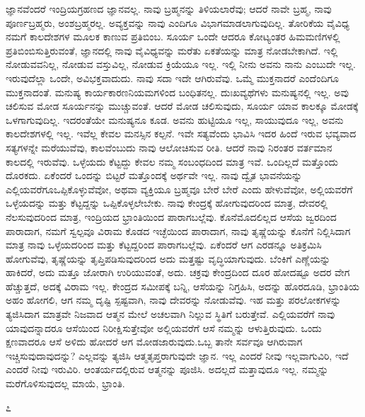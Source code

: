 ಜ್ಞಾನವೆಂದರೆ ಇಂದ್ರಿಯಗ್ರಹಣದ ಜ್ಞಾನವಲ್ಲ. ನಾವು ಬ್ರಹ್ಮನನ್ನು ತಿಳಿಯಲಾರೆವು; ಆದರೆ ನಾವೇ ಬ್ರಹ್ಮ, ನಾವು ಪೂರ್ಣಬ್ರಹ್ಮರು, ಅಂಶಬ್ರಹ್ಮರಲ್ಲ. ಅವ್ಯಕ್ತವನ್ನು ನಾವು ಎಂದಿಗೂ ವಿಭಾಗಮಾಡಲಾಗುವುದಿಲ್ಲ. ತೋರಿಕೆಯ ವೈವಿಧ್ಯ ನಮಗೆ ಕಾಲದೇಶಗಳ ಮೂಲಕ ಕಾಣುವ ಪ್ರತಿಬಿಂಬ. ಸೂರ್ಯ ಒಂದೇ ಆದರೂ ಕೋಟ್ಯಂತರ ಹಿಮಮಣಿಗಳಲ್ಲಿ ಪ್ರತಿಬಿಂಬಿಸುತ್ತಿರುವಂತೆ, ಜ್ಞಾನದಲ್ಲಿ ನಾವು ವೈವಿಧ್ಯವನ್ನು ಮರೆತು ಏಕತೆಯನ್ನು ಮಾತ್ರ ನೋಡಬೇಕಾಗಿದೆ. ಇಲ್ಲಿ ನೋಡುವವನಿಲ್ಲ, ನೋಡುವ ವಸ್ತುವಿಲ್ಲ, ನೋಡುವ ಕ್ರಿಯೆಯೂ ಇಲ್ಲ. ಇಲ್ಲಿ ನೀನು ಅವನು ನಾನು ಎಂಬುದೇ ಇಲ್ಲ. ಇರುವುದೆಲ್ಲಾ ಒಂದೇ, ಅವಿಭಕ್ತವಾದುದು. ನಾವು ಸದಾ ಇದೇ ಆಗಿರುವೆವು. ಒಮ್ಮೆ ಮುಕ್ತನಾದರೆ ಎಂದೆಂದಿಗೂ ಮುಕ್ತನಾದಂತೆ. ಮನುಷ್ಯ ಕಾರ್ಯಕಾರಣನಿಯಮಗಳಿಂದ ಬಂಧಿತನಲ್ಲ. ದುಃಖವ್ಯಥೆಗಳು ಮನುಷ್ಯನಲ್ಲಿ ಇಲ್ಲ. ಅವು ಚಲಿಸುವ ಮೋಡ ಸೂರ್ಯನನ್ನು ಮುಚ್ಚುವಂತೆ. ಆದರೆ ಮೋಡ ಚಲಿಸುವುದು, ಸೂರ್ಯ ಯಾವ ಕಾಲಕ್ಕೂ ಮೋಡಕ್ಕೆ ಒಳಗಾಗುವುದಿಲ್ಲ. ಇದರಂತೆಯೇ ಮನುಷ್ಯನೂ ಕೂಡ. ಅವನು ಹುಟ್ಟಿಯೂ ಇಲ್ಲ, ಸಾಯುವುದೂ ಇಲ್ಲ, ಅವನು ಕಾಲದೇಶಗಳಲ್ಲಿ ಇಲ್ಲ. ಇವೆಲ್ಲ ಕೇವಲ ಮನಸ್ಸಿನ ಕಲ್ಪನೆ. ಇವೇ ಸತ್ಯವೆಂದು ಭಾವಿಸಿ ಇದರ ಹಿಂದೆ ಇರುವ ಭವ್ಯವಾದ ಸತ್ಯಗಳನ್ನೇ ಮರೆಯುವೆವು, ಕಾಲವೆಂಬುದು ನಾವು ಆಲೋಚಿಸುವ ರೀತಿ. ಆದರೆ ನಾವು ನಿರಂತರ ವರ್ತಮಾನ ಕಾಲದಲ್ಲಿ ಇರುವೆವು. ಒಳ್ಳೆಯದು ಕೆಟ್ಟದ್ದು ಕೇವಲ ನಮ್ಮ ಸಂಬಂಧದಿಂದ ಮಾತ್ರ ಇವೆ. ಒಂದಿಲ್ಲದೆ ಮತ್ತೊಂದು ದೊರಕದು. ಏಕೆಂದರೆ ಒಂದನ್ನು ಬಿಟ್ಟರೆ ಮತ್ತೊಂದಕ್ಕೆ ಅರ್ಥವೇ ಇಲ್ಲ. ನಾವು ದ್ವೈತ ಭಾವನೆಯನ್ನು ಎಲ್ಲಿಯವರೆಗೂ\break ಒಪ್ಪಿಕೊಳ್ಳುವೆವೋ, ಅಥವಾ ವ್ಯಕ್ತಿಯೂ ಬ್ರಹ್ಮವೂ ಬೇರೆ ಬೇರೆ ಎಂದು ಹೇಳುವೆವೋ, ಅಲ್ಲಿಯವರೆಗೆ ಒಳ್ಳೆಯದನ್ನು ಮತ್ತು ಕೆಟ್ಟದ್ದನ್ನು ಒಪ್ಪಿಕೊಳ್ಳಲೇಬೇಕು. ನಾವು ಕೇಂದ್ರಕ್ಕೆ ಹೋಗುವುದರಿಂದ ಮಾತ್ರ, ದೇವರಲ್ಲಿ ನೆಲಸುವುದರಿಂದ ಮಾತ್ರ, ಇಂದ್ರಿಯದ ಭ್ರಾಂತಿಯಿಂದ ಪಾರಾಗಬಲ್ಲೆವು. ಕೊನೆಮೊದಲಿಲ್ಲದ ಆಸೆಯ ಜ್ವರದಿಂದ ಪಾರಾದಾಗ, ನಮಗೆ ಸ್ವಲ್ಪವೂ ವಿರಾಮ ಕೊಡದ ಇಚ್ಛೆಯಿಂದ ಪಾರಾದಾಗ, ನಾವು ತೃಷ್ಣೆಯನ್ನು ಕೊನೆಗೆ ನಿಲ್ಲಿಸಿದಾಗ ಮಾತ್ರ ನಾವು ಒಳ್ಳೆಯದರಿಂದ ಮತ್ತು ಕೆಟ್ಟದ್ದರಿಂದ ಪಾರಾಗಬಲ್ಲೆವು. ಏಕೆಂದರೆ ಆಗ ಎರಡನ್ನೂ ಅತಿಕ್ರಮಿಸಿ ಹೋಗುವೆವು, ತೃಷ್ಣೆಯನ್ನು ತೃಪ್ತಿಪಡಿಸುವುದರಿಂದ ಅದು ಮತ್ತಷ್ಟು ವೃದ್ಧಿಯಾಗುವುದು. ಬೆಂಕಿಗೆ ಎಣ್ಣೆಯನ್ನು ಹಾಕಿದರೆ, ಅದು ಮತ್ತೂ ಜೋರಾಗಿ ಉರಿಯುವಂತೆ, ಅದು. ಚಕ್ರವು ಕೇಂದ್ರದಿಂದ ದೂರ ಹೋದಷ್ಟೂ ಅದರ ವೇಗ ಹೆಚ್ಚುತ್ತದೆ, ಅದಕ್ಕೆ ವಿರಾಮ ಇಲ್ಲ. ಕೇಂದ್ರದ ಸಮೀಪಕ್ಕೆ ಬನ್ನಿ, ಆಸೆಯನ್ನು ನಿಗ್ರಹಿಸಿ, ಅದನ್ನು ಹೊರದೂಡಿ, ಭ್ರಾಂತಿಯ ಅಹಂ ಹೋಗಲಿ, ಆಗ ನಮ್ಮ ದೃಷ್ಟಿ ಸ್ಪಷ್ಟವಾಗಿ, ನಾವು ದೇವರನ್ನು ನೋಡುವೆವು. ಇಹ ಮತ್ತು ಪರಲೋಕಗಳನ್ನು ತ್ಯಜಿಸಿದಾಗ ಮಾತ್ರವೇ ನಿಜವಾದ ಆತ್ಮನ ಮೇಲೆ ಅಚಲವಾಗಿ ನಿಲ್ಲುವ ಸ್ಥಿತಿಗೆ ಬರುತ್ತೇವೆ. ಎಲ್ಲಿಯವರೆಗೆ ನಾವು ಯಾವುದನ್ನಾದರೂ ಆಸೆಯಿಂದ ನಿರೀಕ್ಷಿಸುತ್ತೇವೋ ಅಲ್ಲಿಯವರೆಗೆ ಆಸೆ ನಮ್ಮನ್ನು ಆಳುತ್ತಿರುವುದು. ಒಂದು ಕ್ಷಣವಾದರೂ ಆಸೆ ಅಳಿದು ಹೋದರೆ ಆಗ ಮೋಡಜಾರುವುದು.ಒಬ್ಬ ತಾನೇ ಸರ್ವವೂ ಆಗಿರುವಾಗ ಇಚ್ಚಿಸುವುದಾವುದನ್ನು? ಎಲ್ಲವನ್ನು ತ್ಯಜಿಸಿ ಆತ್ಮತೃಪ್ತರಾಗುವುದೇ ಜ್ಞಾನ. ಇಲ್ಲ ಎಂದರೆ ನೀವು ಇಲ್ಲವಾಗುವಿರಿ, ಇದೆ ಎಂದರೆ ನೀವು ಇರುವಿರಿ. ಆಂತರ್ಯದಲ್ಲಿರುವ ಆತ್ಮನನ್ನು ಪೂಜಿಸಿ. ಅದಲ್ಲದೆ ಮತ್ತಾವುದೂ ಇಲ್ಲ. ನಮ್ಮನ್ನು ಮರೆಗೊಳಿಸುವುದಲ್ಲ ಮಾಯೆ, ಭ್ರಾಂತಿ.

\begin{center}
೭
\end{center}

